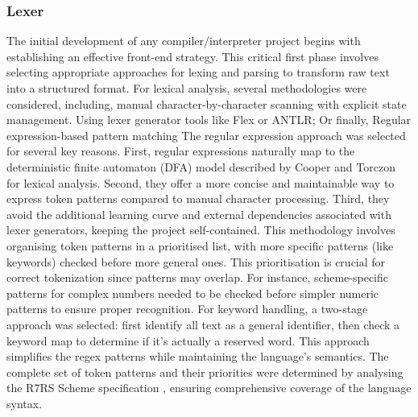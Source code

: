 \documentclass[final]{cmpreport_02}
\begin{document}
\subsubsection{Lexer}
The initial development of any compiler/interpreter project begins with establishing an effective front-end strategy. This critical first phase involves selecting appropriate approaches for lexing and parsing to transform raw text into a structured format.
For lexical analysis, several methodologies were considered, including, manual character-by-character scanning with explicit state management. Using lexer generator tools like Flex or ANTLR; Or finally, Regular expression-based pattern matching
The regular expression approach was selected for several key reasons. 
First, regular expressions naturally map to the deterministic finite automaton (DFA) model described by Cooper and Torczon \cite{cooper2011engineering} for lexical analysis. Second, they offer a more concise and maintainable way to express token patterns compared to manual character processing. Third, they avoid the additional learning curve and external dependencies associated with lexer generators, keeping the project self-contained.
This methodology involves organising token patterns in a prioritised list, with more specific patterns (like keywords) checked before more general ones. This prioritisation is crucial for correct tokenization since patterns may overlap. For instance, scheme-specific patterns for complex numbers needed to be checked before simpler numeric patterns to ensure proper recognition.
For keyword handling, a two-stage approach was selected: first identify all text as a general identifier, then check a keyword map to determine if it's actually a reserved word. This approach simplifies the regex patterns while maintaining the language's semantics.
The complete set of token patterns and their priorities were determined by analysing the R7RS Scheme specification \cite{r7rs}, ensuring comprehensive coverage of the language syntax.
\end{document}

